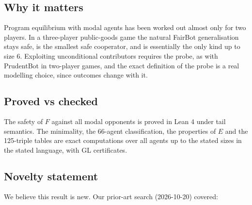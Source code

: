 \documentclass{article}
\begin{document}
\subsection*{Why it matters}

Program equilibrium with modal agents has been worked out almost only for two players. In a
three-player public-goods game the natural FairBot generalisation stays safe, is the smallest safe
cooperator, and is essentially the only kind up to size 6. Exploiting unconditional contributors
requires the probe, as with PrudentBot in two-player games, and the exact definition of the probe
is a real modelling choice, since outcomes change with it.

\subsection*{Proved vs checked}

The safety of $F$ against all modal opponents is proved in Lean 4 under tail semantics. The
minimality, the 66-agent classification, the properties of $E$ and the 125-triple tables are exact
computations over all agents up to the stated sizes in the stated language, with GL certificates.

\subsection*{Novelty statement}

We believe this result is new. Our prior-art search (2026-10-20) covered:
\end{document}
